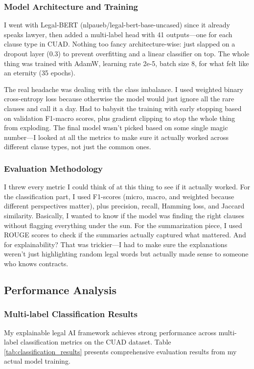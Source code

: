 \subsubsection{Model Architecture and Training}

I went with Legal-BERT (nlpaueb/legal-bert-base-uncased) since it already speaks lawyer, then added a multi-label head with 41 outputs—one for each clause type in CUAD. Nothing too fancy architecture-wise: just slapped on a dropout layer (0.3) to prevent overfitting and a linear classifier on top. The whole thing was trained with AdamW, learning rate 2e-5, batch size 8, for what felt like an eternity (35 epochs).

The real headache was dealing with the class imbalance. I used weighted binary cross-entropy loss because otherwise the model would just ignore all the rare clauses and call it a day. Had to babysit the training with early stopping based on validation F1-macro scores, plus gradient clipping to stop the whole thing from exploding. The final model wasn't picked based on some single magic number—I looked at all the metrics to make sure it actually worked across different clause types, not just the common ones.

\subsubsection{Evaluation Methodology}

I threw every metric I could think of at this thing to see if it actually worked. For the classification part, I used F1-scores (micro, macro, and weighted because different perspectives matter), plus precision, recall, Hamming loss, and Jaccard similarity. Basically, I wanted to know if the model was finding the right clauses without flagging everything under the sun. For the summarization piece, I used ROUGE scores to check if the summaries actually captured what mattered. And for explainability? That was trickier—I had to make sure the explanations weren't just highlighting random legal words but actually made sense to someone who knows contracts.

\subsection{Performance Analysis}
\label{subsec:performance_analysis}

\subsubsection{Multi-label Classification Results}
My explainable legal AI framework achieves strong performance across multi-label classification metrics on the CUAD dataset. Table \ref{tab:classification_results} presents comprehensive evaluation results from my actual model training.


